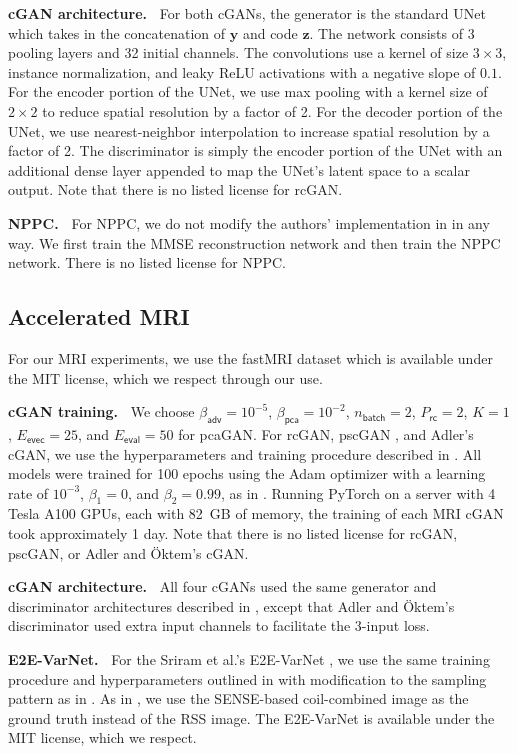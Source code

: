 \documentclass{article}
\theoremstyle{plain}
\theoremstyle{definition}
\theoremstyle{remark}
\renewcommand{\vec}[1]{\ensuremath{\boldsymbol{#1}}}
\newcommand{\batch}{_{\mathsf{batch}}}
\newcommand{\train}{_{\mathsf{rc}}}
\newcommand{\eval}{_{\mathsf{eval}}}
\newcommand{\evec}{_{\mathsf{evec}}}
\newcommand{\betaadv}{\beta_{\mathsf{adv}}}
\newcommand{\betapca}{\beta_{\mathsf{pca}}}
\begin{document}
\textbf{cGAN architecture.~}
For both cGANs, the generator is the standard UNet which takes in the concatenation of $\vec{y}$ and code $\vec{z}$.
The network consists of 3 pooling layers and 32 initial channels.
The convolutions use a kernel of size $3\times 3$, instance normalization, and leaky ReLU activations with a negative slope of $0.1$.
For the encoder portion of the UNet, we use max pooling with a kernel size of $2\times 2$ to reduce spatial resolution by a factor of 2.
For the decoder portion of the UNet, we use nearest-neighbor interpolation to increase spatial resolution by a factor of 2.
The discriminator is simply the encoder portion of the UNet with an additional dense layer appended to map the UNet's latent space to a scalar output.
Note that there is no listed license for rcGAN.

\textbf{NPPC.~}
For NPPC, we do not modify the authors' implementation in \cite{Nehme:github:23} in any way.
We first train the MMSE reconstruction network and then train the NPPC network.
There is no listed license for NPPC.

\subsection{Accelerated MRI}
For our MRI experiments, we use the fastMRI dataset which is available under the MIT license, which we respect through our use.

\textbf{cGAN training.~}
We choose $\betaadv = 10^{-5}$, $\betapca=10^{-2}$, $n\batch=2$, $P\train=2$, $K=1$, $E\evec=25$, and $E\eval=50$ for pcaGAN.
For rcGAN, pscGAN , and Adler's cGAN, we use the hyperparameters and training procedure described in \cite{Bendel:NIPS:23}.
All models were trained for 100 epochs using the Adam optimizer \cite{Kingma:ICLR:15} with a learning rate of $10^{-3}$, $\beta_1=0$, and $\beta_2=0.99$, as in \cite{Karras:ICLR:18}.
Running PyTorch on a server with 4 Tesla A100 GPUs, each with 82~GB of memory, the training of each MRI cGAN took approximately 1 day.
Note that there is no listed license for rcGAN, pscGAN, or Adler and \"Oktem's cGAN.

\textbf{cGAN architecture.~} 
All four cGANs used the same generator and discriminator architectures described in \cite{Bendel:NIPS:23}, except that Adler and \"Oktem's discriminator used extra input channels to facilitate the 3-input loss.

\textbf{E2E-VarNet.~}
For the Sriram et al.'s E2E-VarNet \cite{Sriram:MICCAI:20}, we use the same training procedure and hyperparameters outlined in \cite{Jalal:NIPS:21} with modification to the sampling pattern as in \cite{Bendel:NIPS:23}.
As in \cite{Jalal:NIPS:21}, we use the SENSE-based coil-combined image as the ground truth instead of the RSS image.
The E2E-VarNet is available under the MIT license, which we respect.
\end{document}
